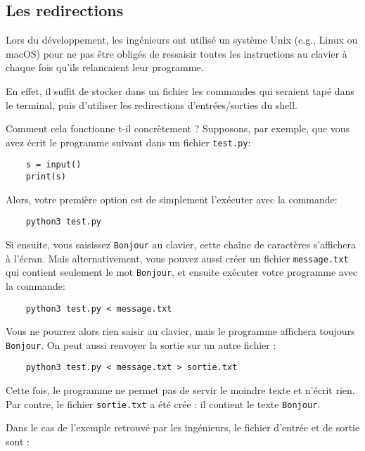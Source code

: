 \documentclass{article}
\begin{document}
\subsection{Les redirections}

Lors du développement, les ingénieurs ont utilisé un système Unix (e.g., Linux ou macOS)
pour ne pas être obligés de ressaisir toutes les instructions au clavier à chaque fois
qu'ils relancaient leur programme.

En effet, il suffit de stocker dans un fichier les commandes qui seraient tapé dans le terminal,
puis d'utiliser les redirections d'entrées/sorties du shell.


Comment cela fonctionne t-il concrètement ? Supposons, par exemple,
que vous avez écrit le programme suivant dans un fichier \texttt{test.py}:
\begin{verbatim}
    s = input()
    print(s)
\end{verbatim}
Alors, votre première option est de simplement l'exécuter avec la commande:
\begin{verbatim}
    python3 test.py
\end{verbatim}
Si ensuite, vous saisissez \texttt{Bonjour} au clavier,
cette chaîne de caractères s'affichera à l'écran.
Mais alternativement,
vous pouvez aussi créer un fichier \texttt{message.txt}
qui contient seulement le mot \texttt{Bonjour},
et ensuite exécuter votre programme avec la commande:
\begin{verbatim}
    python3 test.py < message.txt
\end{verbatim}
Vous ne pourrez alors rien saisir au clavier,
mais le programme affichera toujours \texttt{Bonjour}.
On peut aussi renvoyer la sortie sur un autre fichier :
\begin{verbatim}
    python3 test.py < message.txt > sortie.txt
\end{verbatim}
Cette fois, le programme ne permet pas de servir le moindre texte
et n'écrit rien. Par contre, le fichier {\tt sortie.txt} a été crée : il contient
le texte \texttt{Bonjour}.

\bigskip

Dans le cas de l'exemple retrouvé par les ingénieurs, le fichier d'entrée et de sortie sont :
\end{document}

